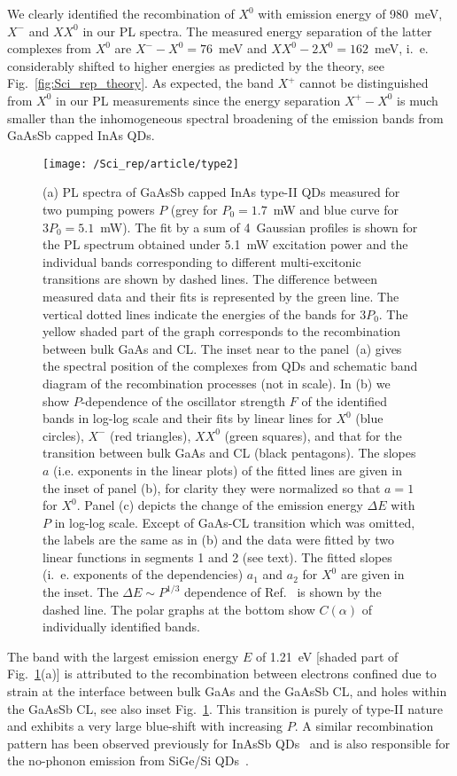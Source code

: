 We clearly identified the recombination of $X^0$ with emission energy of 980~meV, $X^-$ and $XX^0$ in our PL spectra. The measured energy separation of the latter complexes from $X^0$ are $X^- - X^0=76$~meV and $XX^0-2X^0=162$~meV, i.~e. considerably shifted to higher energies as predicted by the theory, see Fig.~\ref{fig:Sci_rep_theory}. As expected, the band $X^+$ cannot be distinguished from $X^0$ in our PL measurements since the energy separation $X^+-X^0$ is much smaller than the inhomogeneous spectral broadening of the emission bands from GaAsSb capped InAs QDs.
%
\begin{figure}
	\centering
	\texttt{[image: /Sci\_rep/article/type2]}
	\caption{(a) PL spectra of GaAsSb capped InAs type-II QDs measured for two pumping powers $P$ (grey for $P_0=1.7$~mW and blue curve for $3P_0=5.1$~mW). The fit by a sum of 4~Gaussian profiles is shown for the PL spectrum obtained under 5.1~mW excitation power and the individual bands corresponding to different multi-excitonic transitions are shown by dashed lines. The difference between measured data and their fits is represented by the green line. The vertical dotted lines indicate the energies of the bands for $3P_0$. The yellow shaded part of the graph corresponds to the recombination between bulk GaAs and CL. The inset near to the panel~(a) gives the spectral position of the complexes from QDs and schematic band diagram of the recombination processes (not in scale). In (b) we show $P$-dependence of the oscillator strength $F$ of the identified bands in log-log scale and their fits by linear lines for $X^0$ (blue circles), $X^-$ (red triangles), $XX^0$ (green squares), and that for the transition between bulk GaAs and CL (black pentagons). The slopes $a$ (i.e. exponents in the linear plots) of the fitted lines are given in the inset of panel (b), for clarity they were normalized so that $a=1$ for $X^0$. Panel (c) depicts the change of the emission energy $\Delta E$ with $P$ in log-log scale. Except of GaAs-CL transition which was omitted, the labels are the same as in (b) and the data were fitted by two linear functions in segments 1 and 2 (see text). The fitted slopes (i.~e. exponents of the dependencies) $a_1$ and $a_2$ for $X^0$ are given in the inset. The $\Delta E\sim P^{1/3}$ dependence of Ref.~\citep{Hatami1998} is shown by the dashed line. The polar graphs at the bottom show $C(\alpha)$ of individually identified bands.}
	\label{fig:sci_rep_typeII}
\end{figure}

The band with the largest emission energy $E$ of 1.21~eV [shaded part of Fig.~\ref{fig:sci_rep_typeII}(a)] is attributed to the recombination between electrons confined due to strain at the interface between bulk GaAs and the GaAsSb CL, and holes within the GaAsSb CL, see also inset Fig.~\ref{fig:sci_rep_typeII}. This transition is purely of type-II nature and exhibits a very large blue-shift with increasing $P$. A similar recombination pattern has been observed previously for InAsSb QDs~\cite{Mazur2012} and is also responsible for the no-phonon emission from SiGe/Si QDs~\cite{SiGeKlenovsky}. 

